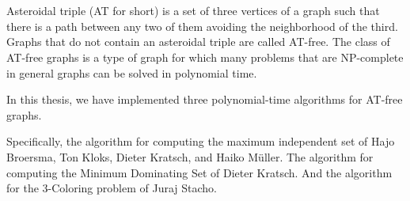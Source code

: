 \chapter*{\csebilabstract}
\addstarredchapter{\csebilabstract} %
\makecsebilabstract

\noindent Asteroidal triple (AT for short) is a set of three vertices of a graph such that there is a path between any two of them avoiding the neighborhood of the third. Graphs that do not contain an asteroidal triple are called AT-free. The class of AT-free graphs is a type of graph for which many problems that are NP-complete in general graphs can be solved in polynomial time.

In this thesis, we have implemented three polynomial-time algorithms for AT-free graphs.

Specifically, the algorithm for computing the maximum independent set of Hajo Broersma, Ton Kloks, Dieter Kratsch, and Haiko Müller\cite{at-free-independent-sets}. The algorithm for computing the Minimum Dominating Set of Dieter Kratsch\cite{at-free-independent-sets}. And the algorithm for the 3-Coloring problem of Juraj Stacho\cite{at-free-3-colouring}. 